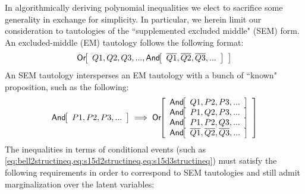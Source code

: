 In algorithmically deriving polynomial inequalities we elect to sacrifice some generality in exchange for simplicity. In particular, we herein limit our consideration to tautologies of the ``supplemented excluded middle" (SEM) form. An excluded-middle (EM) tautology follows the following format: 
\begin{align}
\NamedFunction{Or}{Q1 , Q2 , Q3 ,..., \NamedFunction{And}{\n{Q1} ,\n{Q2},\n{Q3},...}}
\end{align}
An SEM tautology intersperses an EM tautology with a bunch of ``known" proposition, such as the following:
\begin{align}
\NamedFunction{And}{P1, P2 , P3 , ...} \implies 
\NamedFunction{Or}{
  \NamedFunction{And}{Q1, P2 , P3 , ...}
\\\NamedFunction{And}{P1, Q2 , P3 , ...}
\\\NamedFunction{And}{P1, P2 , Q3 , ...}
\\\NamedFunction{And}{\n{Q1} ,\n{Q2},\n{Q3},...}
}
\end{align}
The inequalities in terms of conditional events (such as \cref{eq:bell2structineq,eq:s15d2structineq,eq:s15d3structineq}) must satisfy the following requirements in order to correspond to SEM tautologies and still admit marginalization over the latent variables:
